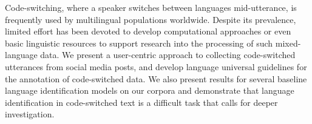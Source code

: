 Code-switching, where a speaker switches between languages mid-utterance, is frequently used by multilingual populations worldwide. Despite its prevalence, limited effort has been devoted to develop computational approaches or even basic linguistic resources to support research into the processing of such mixed-language data. We present a user-centric approach to collecting code-switched utterances from social media posts, and develop language universal guidelines for the annotation of code-switched data. We also present results for several baseline language identification models on our corpora and demonstrate that language identification in code-switched text is a difficult task that calls for deeper investigation.

